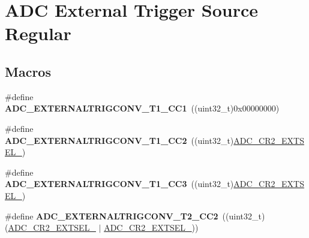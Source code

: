 \hypertarget{group___a_d_c___external__trigger___source___regular}{}\section{A\+DC External Trigger Source Regular}
\label{group___a_d_c___external__trigger___source___regular}
\subsection*{Macros}
\begin{DoxyCompactItemize}
\item 
\#define {\bfseries A\+D\+C\+\_\+\+E\+X\+T\+E\+R\+N\+A\+L\+T\+R\+I\+G\+C\+O\+N\+V\+\_\+\+T1\+\_\+\+C\+C1}~((uint32\+\_\+t)0x00000000)\hypertarget{group___a_d_c___external__trigger___source___regular_ga7d49b9a93e2452633d650a5bfd2cce23}{}\label{group___a_d_c___external__trigger___source___regular_ga7d49b9a93e2452633d650a5bfd2cce23}

\item 
\#define {\bfseries A\+D\+C\+\_\+\+E\+X\+T\+E\+R\+N\+A\+L\+T\+R\+I\+G\+C\+O\+N\+V\+\_\+\+T1\+\_\+\+C\+C2}~((uint32\+\_\+t)\hyperlink{group___peripheral___registers___bits___definition_ga9410c7fd93f6d0b157ede745ee269d7b}{A\+D\+C\+\_\+\+C\+R2\+\_\+\+E\+X\+T\+S\+E\+L\+\_})\hypertarget{group___a_d_c___external__trigger___source___regular_gaf40cf21366c12d956241193bca60b1f9}{}\label{group___a_d_c___external__trigger___source___regular_gaf40cf21366c12d956241193bca60b1f9}

\item 
\#define {\bfseries A\+D\+C\+\_\+\+E\+X\+T\+E\+R\+N\+A\+L\+T\+R\+I\+G\+C\+O\+N\+V\+\_\+\+T1\+\_\+\+C\+C3}~((uint32\+\_\+t)\hyperlink{group___peripheral___registers___bits___definition_ga5a6725419743a8d01b4a223609952893}{A\+D\+C\+\_\+\+C\+R2\+\_\+\+E\+X\+T\+S\+E\+L\+\_})\hypertarget{group___a_d_c___external__trigger___source___regular_ga3f562fb50959d72533aecd761175521a}{}\label{group___a_d_c___external__trigger___source___regular_ga3f562fb50959d72533aecd761175521a}

\item 
\#define {\bfseries A\+D\+C\+\_\+\+E\+X\+T\+E\+R\+N\+A\+L\+T\+R\+I\+G\+C\+O\+N\+V\+\_\+\+T2\+\_\+\+C\+C2}~((uint32\+\_\+t)(\hyperlink{group___peripheral___registers___bits___definition_ga5a6725419743a8d01b4a223609952893}{A\+D\+C\+\_\+\+C\+R2\+\_\+\+E\+X\+T\+S\+E\+L\+\_} $\vert$ \hyperlink{group___peripheral___registers___bits___definition_ga9410c7fd93f6d0b157ede745ee269d7b}{A\+D\+C\+\_\+\+C\+R2\+\_\+\+E\+X\+T\+S\+E\+L\+\_}))\hypertarget{group___a_d_c___external__trigger___source___regular_ga0b64a9b8ac627c2ca770622c8ada41e6}{}\label{group___a_d_c___external__trigger___source___regular_ga0b64a9b8ac627c2ca770622c8ada41e6}


\end{DoxyCompactItemize}
